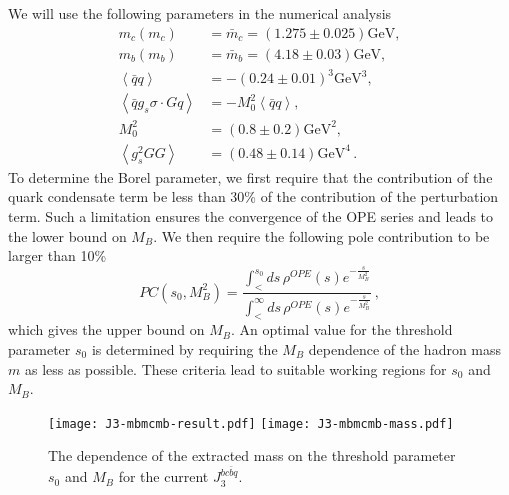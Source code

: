 \documentclass[prd,showpacs,showkeys,floatfix,amsmath,amssymb,floatfix,english]{revtex4}
\begin{document}
We will use the following parameters
\cite{1985-Reinders-p1-1,2016-Patrignani-p100001-100001,2012-Narison-p259-263,2007-Kuhn-p192-215}
in the numerical analysis
\begin{align}
m_{c}\left(m_{c}\right) & =\bar{m}_{c}=\left(1.275\pm0.025\right)\mathrm{GeV},\nonumber \\
m_{b}\left(m_{b}\right) & =\bar{m}_{b}=\left(4.18\pm0.03\right)\mathrm{GeV},\nonumber \\
\left\langle \bar{q}q\right\rangle  & =-\left(0.24\pm0.01\right)^{3}\mathrm{GeV}^{3},\nonumber \\
\left\langle \bar{q}g_{s}\sigma\cdot Gq\right\rangle  & =-M_{0}^{2}\left\langle \bar{q}q\right\rangle ,\\
M_{0}^{2} & =\left(0.8\pm0.2\right)\mathrm{GeV}^{2},\nonumber \\
\left\langle g_{s}^{2}GG\right\rangle  &
=\left(0.48\pm0.14\right)\mathrm{GeV}^{4}\, .\nonumber
\end{align}
To determine the Borel parameter, we first require that the
contribution of the quark condensate term be less than 30\% of the
contribution of the perturbation term. Such a limitation ensures the
convergence of the OPE series and leads to the lower bound on
$M_{B}$. We then require the following pole contribution to be
larger than 10\%
\begin{equation}
PC\left(s_{0},M_{B}^{2}\right)=\frac{\int_{<}^{s_{0}}ds\,\rho^{OPE}\left(s\right)e^{-\frac{s}{M_{B}^{2}}}}{\int_{<}^{\infty}ds\,\rho^{OPE}\left(s\right)e^{-\frac{s}{M_{B}^{2}}}}\,
,
\end{equation}
which gives the upper bound on $M_{B}$. An optimal value for the
threshold parameter $s_{0}$ is determined by requiring the $M_{B}$
dependence of the hadron mass $m$ as less as possible. These
criteria lead to suitable working regions for $s_{0}$ and $M_{B}$.

\begin{figure}
\begin{centering}
\texttt{[image: J3-mbmcmb-result.pdf]}
\texttt{[image: J3-mbmcmb-mass.pdf]}
\par\end{centering}
\caption{\label{fig:The-mass-curve}The dependence of the extracted
mass on the threshold parameter $s_{0}$ and $M_{B}$ for the current
$J_{3}^{bc\bar{b}q}$. }
\end{figure}
\end{document}
